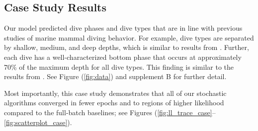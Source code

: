 \subsection{Case Study Results}

Our model predicted dive phases and dive types that are in line with previous studies of marine mammal diving behavior. For example, dive types are separated by shallow, medium, and deep depths, which is similar to results from \citet{Barajas:2017}. Further, each dive has a well-characterized bottom phase that occurs at approximately 70\% of the maximum depth for all dive types. This finding is similar to the results from \citet{Tennessen:2019a}. See Figure (\ref{fig:data}) and supplement B for further detail.

Most importantly, this case study demonstrates that all of our stochastic algorithms converged in fewer epochs and to regions of higher likelihood compared to the full-batch baselines; see Figures (\ref{fig:ll_trace_case}--\ref{fig:scatterplot_case}).

